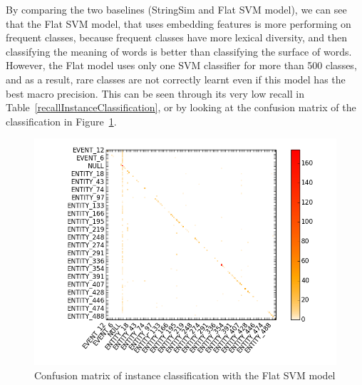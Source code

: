 \documentclass[twocolumn]{article}
\begin{document}
By comparing the two baselines (StringSim and Flat SVM model), we can see that the Flat SVM model, that uses embedding features is more performing on frequent classes, because frequent classes have more lexical diversity, and then classifying the meaning of words is better than classifying the surface of words. However, the Flat model uses only one SVM classifier for more than 500 classes, and as a result, rare classes are not correctly learnt even if this model has the best macro precision. This can be seen through its very low recall in Table~\ref{recallInstanceClassification}, or by looking at the confusion matrix of the classification in Figure~\ref{flatConfusion}.\\

\begin{figure}[t]
   \centering \includegraphics[width=\linewidth]{Figures/Confusion_Matrices/confusionMatrixInstanceClassificationGlobal_flat.png}
   \caption{\label{flatConfusion} Confusion matrix of instance classification with the Flat SVM model}
\end{figure}
\end{document}
